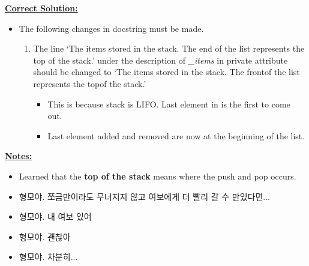 \documentclass[12pt]{article}
\begin{document}
\begin{mdframed}
    \underline{\textbf{Correct Solution:}}

    \bigskip

    \begin{itemize}
        \item

        The following changes in docstring must be made.

        \begin{enumerate}[1.]
            \item The line `The items stored in the stack. The end of the list represents the top of the stack.'
            under the description of \textit{\_items} in private attribute should be changed to
            `The items stored in the stack. The \color{red}front\color{black}\:of the list represents the \color{red}top\color{black}\:of the stack.'
            \color{red}
                \begin{itemize}
                    \item This is because stack is LIFO. Last element in is the first to come out.
                    \item Last element added and removed are now at the beginning of the list.
                \end{itemize}
            \color{black}
        \end{enumerate}
    \end{itemize}

\end{mdframed}

\bigskip

\underline{\textbf{Notes:}}

\bigskip

\begin{itemize}
    \item Learned that the \textbf{top of the stack} means where the push and pop occurs.
    \item 형모야. 쪼금만이라도 무너지지 않고 여보에게 더 빨리 갈 수 만있다면...
    \item 형모야. 내 여보 있어
    \item 형모야. 괜찮아
    \item 형모야. 차분히...
\end{itemize}
\end{document}
